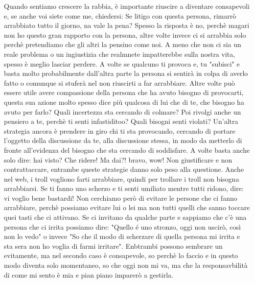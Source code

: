 \documentclass[12pt]{book} %
\begin{document}
Quando sentiamo crescere la rabbia, è importante riuscire a diventare consapevoli e, se anche voi siete come me, chiedersi:
Se litigo con questa persona, rimarrò arrabbiato tutto il giorno, na vale la pena?
Spesso la risposta è no, perchè magari non ho questo gran rapporto con la persona, altre volte invece ci si arrabbia solo perchè pretendiamo che gli altri la pensino come noi. A meno che non ci sia un reale problema o un ingiustizia che realmnete impatterebbe sulla nostra vita, spesso è meglio lasciar perdere. 
A volte se qualcuno ti provoca e, tu "subisci" e basta molto probabilmente dall'altra parte la persona si sentirà in colpa di averlo fatto o comunque si stuferà nel non riuscirti a far arrabbiare. Altre volte può essere utile avere compassione della persona che ha avuto bisogno di provocarti, questa sua azione molto spesso dice più qualcosa di lui che di te, che bisogno ha avuto per farlo? Quali incertezza sta cercando di colmare? Poi rivolgi anche un pensiero a te, perchè ti senti infastiditoo? Quali bisogni senti violati?
Un'altra strategia ancora è prendere in giro chi ti sta provocando, cercando di portare l'oggetto della discussione da te, alla discussione stessa, in modo da metterlo di fronte all'evidenza del bisogno che sta cercando di soddisfare. A volte basta anche solo dire: \newline
hai visto? Che ridere! \newline
Ma dai?! bravo, wow! \newline
Non giustificare e non contrattaccare, entrambe queste strategie danno solo peso alla questione.
Anche nel web, i troll vogliono farti arrabbiare, quindi per trollare i troll non bisogna arrabbiarsi.
Se ti fanno uno scherzo e ti senti umiliato mentre tutti ridono, dire: vi voglio bene bastardi!
Non cerchiamo però di evitare le persone che ci fanno arrabbiare, perchè possiamo evitare lui o lei ma non tutti quelli che sanno toccare quei tasti che ci attivano. Se ci invitano da qualche parte e sappiamo che c'è una persona che ci irrita possiamo dire: "Quello é uno stronzo, oggi non uscirò, così non lo vedo" o invece "So che il modo di scherzare di quella persona mi irrita e sta sera non ho voglia di farmi irritare". Enbtrambi possono sembrare un evitamente, ma nel secondo caso è consapevole, so perchè lo faccio e in questo modo diventa solo momentaneo, so che oggi non mi va, ma che la responsavbilità di come mi sento è mia e pian piano imparerò a gestirla.
\end{document}

